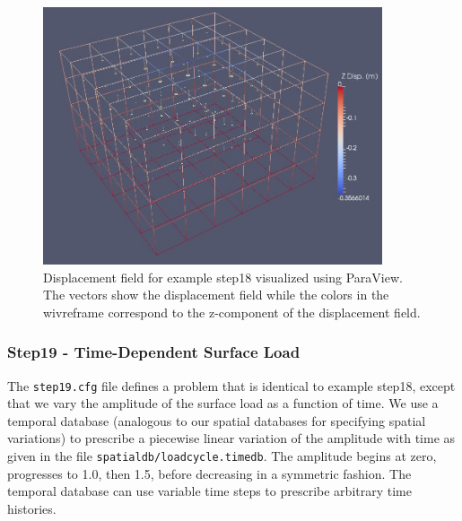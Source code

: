 \begin{figure}
\begin{centering}
\includegraphics[width=10cm]{tutorials/3dhex8/figs/step18-displ}
\par\end{centering}

\caption{Displacement field for example step18 visualized using ParaView. The
vectors show the displacement field while the colors in the wivreframe
correspond to the z-component of the displacement field.\label{fig:step18-displ}}
\end{figure}



\subsubsection{Step19 - Time-Dependent Surface Load}

The \texttt{step19.cfg} file defines a problem that is identical to
example step18, except that we vary the amplitude of the surface load
as a function of time. We use a temporal database (analogous to our
spatial databases for specifying spatial variations) to prescribe
a piecewise linear variation of the amplitude with time as given in
the file \texttt{spatialdb/loadcycle.timedb}. The amplitude begins
at zero, progresses to 1.0, then 1.5, before decreasing in a symmetric
fashion. The temporal database can use variable time steps to prescribe
arbitrary time histories. 

